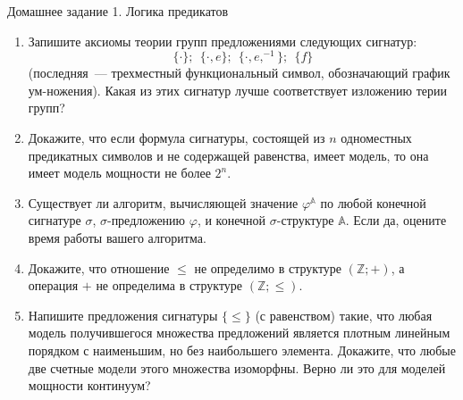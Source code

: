 \documentclass[a4paper,11pt]{article}
\begin{document}
\begin{center}
	\Large Домашнее задание 1. Логика предикатов
\end{center}

\begin{enumerate}
	\item Запишите аксиомы теории групп предложениями следующих сигнатур:
   \[\{\cdot\};\ \ \{\cdot,e\};\ \ \{\cdot,e,^{-1}\};\ \ \{f\}\]
	(последняя~— трехместный функциональный символ, обозначающий график ум-\linebreak ножения). Какая из этих сигнатур лучше соответствует изложению терии групп?

	\item Докажите, что если формула сигнатуры, состоящей из $n$ одноместных предикатных символов и не содержащей равенства, имеет модель, то она имеет модель мощности не более $2^n$. 

	\item Существует ли алгоритм, вычисляющей значение $\varphi^\mathbb{A}$ по любой конечной сигнатуре $\sigma$, $\sigma$-предложению $\varphi$, и конечной $\sigma$-структуре $\mathbb{A}$. Если да, оцените время работы вашего алгоритма.

	\item Докажите, что отношение $\leq$ не определимо в структуре $(\mathbb{Z};+)$, а операция $+$ не определима в структуре $(\mathbb{Z};\leq)$.

	\item Напишите предложения сигнатуры $\{\leq\}$ (с равенством) такие, что любая модель получившегося множества предложений является плотным линейным порядком с наименьшим, но без наибольшего элемента. Докажите, что любые две счетные модели этого множества  изоморфны. Верно ли это для моделей мощности континуум?
\end{enumerate}
\end{document}
